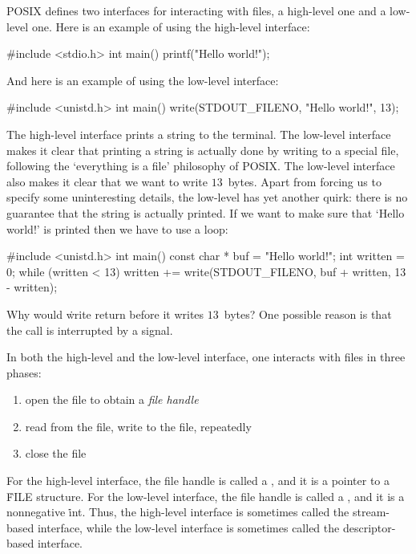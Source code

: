 POSIX defines two interfaces for interacting with files,
  a high-level one and a low-level one.
Here is an example of using the high-level interface:
\begin{ccode}
#include <stdio.h>
int main() {
  printf("Hello world!\n");
}
\end{ccode}
And here is an example of using the low-level interface:
\begin{ccode}
#include <unistd.h>
int main() {
  write(STDOUT_FILENO, "Hello world!\n", 13);
}
\end{ccode}
The high-level interface prints a string to the terminal.
The low-level interface makes it clear that printing a string
  is actually done by writing to a special file,
  following the `everything is a file' philosophy of POSIX\null.
The low-level interface also makes it clear that we want to write $13$~bytes.
Apart from forcing us to specify some uninteresting details,
  the low-level has yet another quirk:
  there is no guarantee that the string is actually printed.
If we want to make sure that `Hello world!' is printed then we have to use a loop:
\begin{ccode}
#include <unistd.h>
int main() {
  const char * buf = "Hello world!\n";
  int written = 0;
  while (written < 13) {
    written += write(STDOUT_FILENO, buf + written, 13 - written);
  }
}
\end{ccode}
Why would \.{write} return before it writes $13$~bytes?
One possible reason is that the call is interrupted by a signal.

In both the high-level and the low-level interface,
  one interacts with files in three phases:
\begin{enumerate}
\item open the file to obtain a \emph{file handle}
\item read from the file, write to the file, repeatedly
\item close the file
\end{enumerate}
For the high-level interface, the file handle is called a ,
  and it is a pointer to a \.{FILE} structure.
For the low-level interface, the file handle is called a ,
  and it is a nonnegative \.{int}.
Thus, the high-level interface is sometimes called the stream-based interface,
  while the low-level interface is sometimes called the descriptor-based interface.

